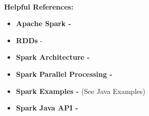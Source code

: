 \documentclass{article}
\begin{document}

\-\ \\ \noindent \textbf{Helpful References:}
\begin{itemize}
    \item \textbf{Apache Spark -}  \href{https://en.wikipedia.org/wiki/Apache_Spark}{\color{blue}{https://en.wikipedia.org/wiki/Apache\_Spark}} \vspace{-0.1cm}
    \item \textbf{RDDs} - \href{https://www.tutorialspoint.com/apache_spark/apache_spark_rdd.htm}{\color{blue}{https://www.tutorialspoint.com/apache\_spark/apache\_spark\_rdd.htm}}\vspace{-0.1cm}
    \item \textbf{Spark Architecture -} \href{https://www.edureka.co/blog/spark-architecture/}{\color{blue}{https://www.edureka.co/blog/spark-architecture/}} \vspace{-0.1cm}
    \item \textbf{Spark Parallel Processing -}
    \href{https://www.simplilearn.com/spark-parallel-processing-tutorial}{\color{blue}{https://www.simplilearn.com/spark-parallel-processing-tutorial}}\vspace{-0.1cm}
    \item \textbf{Spark Examples -} \href{https://spark.apache.org/examples.html}{\color{blue}{https://spark.apache.org/examples.html}} (See Java Examples)\vspace{-0.1cm}
    \item \textbf{Spark Java API -} \href{https://spark.apache.org/docs/latest/api/java/index.html}{\color{blue}{https://spark.apache.org/docs/latest/api/java/index.html}}
\end{itemize}
\end{document}
